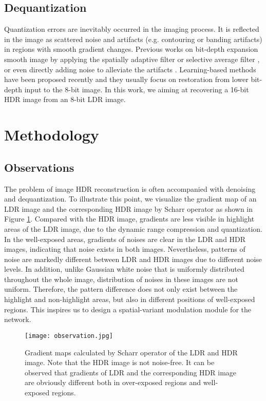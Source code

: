 \documentclass[final]{cvpr}
\begin{document}
\subsection{Dequantization}
Quantization errors are inevitably occurred in the imaging process. It is reflected in the image as scattered noise and artifacts (e.g. contouring or banding artifacts) in regions with smooth gradient changes. Previous works on bit-depth expansion smooth image by applying the spatially adaptive filter \cite{daly2004decontouring} or selective average filter \cite{song2016hardware}, or even directly adding noise to alleviate the artifacts \cite{daly2003bit}. Learning-based methods \cite{hou2017image, liu2018learning, zhao2019deep, punnappurath2020little} have been proposed recently and they usually focus on restoration from lower bit-depth input to the 8-bit image. In this work, we aiming at recovering a 16-bit HDR image from an 8-bit LDR image.  


\section{Methodology}
\subsection{Observations}\label{sec:Observations}
The problem of image HDR reconstruction is often accompanied with denoising and dequantization. To illustrate this point, we visualize the gradient map of an LDR image and the corresponding HDR image by Scharr operator \cite{scharr2004optimal} as shown in Figure \ref{Fig: observation}. Compared with the HDR image, gradients are less visible in highlight areas of the LDR image, due to the dynamic range compression and quantization. In the well-exposed areas, gradients of noises are clear in the LDR and HDR images, indicating that noise exists in both images. Nevertheless, patterns of noise are markedly different between LDR and HDR images due to different noise levels. In addition, unlike Gaussian white noise that is uniformly distributed throughout the whole image, distribution of noises in these images are not uniform. Therefore, the pattern difference does not only exist between the highlight and non-highlight areas, but also in different positions of well-exposed regions. This inspires us to design a spatial-variant modulation module for the network.

\begin{figure}[htp]
    \begin{center}
    \texttt{[image: observation.jpg]}
    \end{center}
    \vspace{-7pt}
    \caption{Gradient maps calculated by Scharr operator \cite{scharr2004optimal} of the LDR and HDR image. Note that the HDR image is not noise-free. It can be observed that gradients of LDR and the corresponding HDR image are obviously different both in over-exposed regions and well-exposed regions.}
    \vspace{-15pt}
    \label{Fig: observation}
\end{figure}
\end{document}
